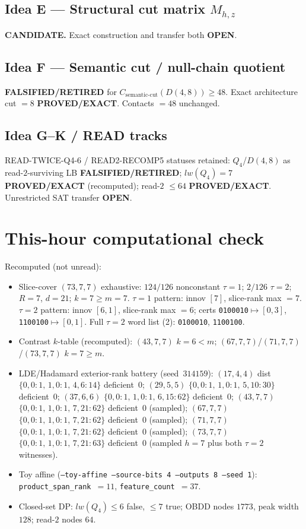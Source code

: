 \documentclass[11pt]{article}
\begin{document}
\subsection*{Idea E --- Structural cut matrix $M_{h,z}$}
\textbf{CANDIDATE.} Exact construction and transfer both \textbf{OPEN}.

\subsection*{Idea F --- Semantic cut / null-chain quotient}
\textbf{FALSIFIED/RETIRED} for $C_{\mathrm{semantic\textrm{-}cut}}(D(4,8))\ge48$.
Exact architecture cut $=8$ \textbf{PROVED/EXACT}. Contacts $=48$ unchanged.

\subsection*{Idea G--K / READ tracks}
READ-TWICE-Q4-6 / READ2-RECOMP5 statuses retained: $Q_4$/$D(4,8)$ as read-$2$-surviving LB
\textbf{FALSIFIED/RETIRED}; $lw(Q_4)=7$ \textbf{PROVED/EXACT} (recomputed); read-$2$ $\le64$
\textbf{PROVED/EXACT}. Unrestricted SAT transfer \textbf{OPEN}.

\section*{This-hour computational check}
Recomputed (not unread):
\begin{itemize}
\item Slice-cover $(73,7,7)$ exhaustive: $124/126$ nonconstant $\tau{=}1$;
  $2/126$ $\tau{=}2$; $R{=}7$, $d{=}21$; $k{=}7{\ge}m{=}7$.
  $\tau{=}1$ pattern: innov $[7]$, slice-rank max $=7$.
  $\tau{=}2$ pattern: innov $[6,1]$, slice-rank max $=6$; certs
  \texttt{0100010}$\mapsto[0,3]$, \texttt{1100100}$\mapsto[0,1]$.
  Full $\tau{=}2$ word list (2): \texttt{0100010}, \texttt{1100100}.
\item Contrast $k$-table (recomputed): $(43,7,7)$ $k{=}6{<}m$;
  $(67,7,7)$/$(71,7,7)$/$(73,7,7)$ $k{=}7{\ge}m$.
\item LDE/Hadamard exterior-rank battery (seed~$314159$):
  $(17,4,4)$ dist $\{0,0{:}1,\,1,0{:}1,\,4,6{:}14\}$ deficient~$0$;
  $(29,5,5)$ $\{0,0{:}1,\,1,0{:}1,\,5,10{:}30\}$ deficient~$0$;
  $(37,6,6)$ $\{0,0{:}1,\,1,0{:}1,\,6,15{:}62\}$ deficient~$0$;
  $(43,7,7)$ $\{0,0{:}1,\,1,0{:}1,\,7,21{:}62\}$ deficient~$0$ (sampled);
  $(67,7,7)$ $\{0,0{:}1,\,1,0{:}1,\,7,21{:}62\}$ deficient~$0$ (sampled);
  $(71,7,7)$ $\{0,0{:}1,\,1,0{:}1,\,7,21{:}62\}$ deficient~$0$ (sampled);
  $(73,7,7)$ $\{0,0{:}1,\,1,0{:}1,\,7,21{:}63\}$ deficient~$0$
  (sampled $h{=}7$ plus both $\tau{=}2$ witnesses).
\item Toy affine (\texttt{--toy-affine --source-bits 4 --outputs 8 --seed 1}):
  \texttt{product\_span\_rank}~$=11$, \texttt{feature\_count}~$=37$.
\item Closed-set DP: $lw(Q_4)\le6$ false, $\le7$ true; OBDD nodes $1773$, peak width $128$;
  read-$2$ nodes $64$.
\end{itemize}
\end{document}
